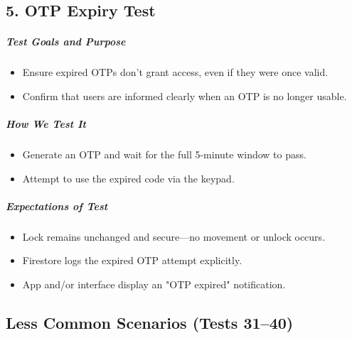 \subsection*{5. OTP Expiry Test}
\subparagraph{Test Goals and Purpose}
\begin{itemize}
    \item Ensure expired OTPs don’t grant access, even if they were once valid.
    \item Confirm that users are informed clearly when an OTP is no longer usable.
\end{itemize}
\subparagraph{How We Test It}
\begin{itemize}
    \item Generate an OTP and wait for the full 5-minute window to pass.
    \item Attempt to use the expired code via the keypad.
\end{itemize}
\subparagraph{Expectations of Test}
\begin{itemize}
    \item Lock remains unchanged and secure—no movement or unlock occurs.
    \item Firestore logs the expired OTP attempt explicitly.
    \item App and/or interface display an "OTP expired" notification.
\end{itemize}




























\newpage
\subsection*{Less Common Scenarios (Tests 31–40)}

